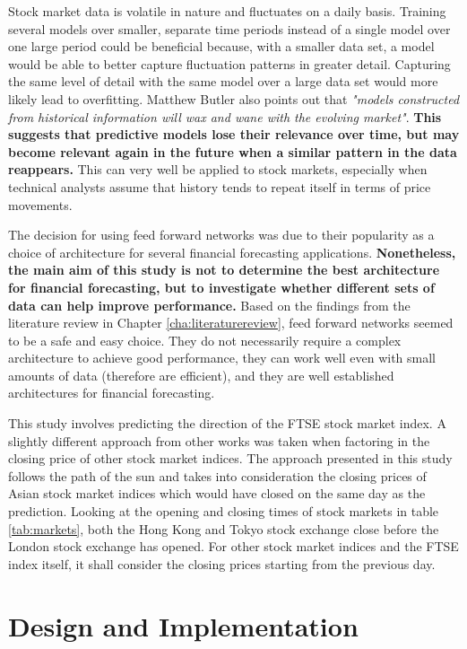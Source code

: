 \documentclass{UoYCSproject}
\begin{document}
Stock market data is volatile in nature and fluctuates on a daily basis. Training several models over smaller, separate time periods instead of a single model over one large period could be beneficial because, with a smaller data set, a model would be able to better capture fluctuation patterns in greater detail. Capturing the same level of detail with the same model over a large data set would more likely lead to overfitting. Matthew Butler also points out that \textit{"models constructed from historical information will wax and wane with the evolving market"}\cite{butler2012computational}. \textbf{This suggests that predictive models lose their relevance over time, but may become relevant again in the future when a similar pattern in the data reappears.} This can very well be applied to stock markets, especially when technical analysts assume that history tends to repeat itself in terms of price movements.

The decision for using feed forward networks was due to their popularity as a choice of architecture for several financial forecasting applications. \textbf{Nonetheless, the main aim of this study is not to determine the best architecture for financial forecasting, but to investigate whether different sets of data can help improve performance.} Based on the findings from the literature review in Chapter \ref{cha:literaturereview}, feed forward networks seemed to be a safe and easy choice. They do not necessarily require a complex architecture to achieve good performance, they can work well even with small amounts of data (therefore are efficient), and they are well established architectures for financial forecasting.    

This study involves predicting the direction of the FTSE stock market index. A slightly different approach from other works was taken when factoring in the closing price of other stock market indices. The approach presented in this study follows the path of the sun and takes into consideration the closing prices of Asian stock market indices which would have closed on the same day as the prediction. Looking at the opening and closing times of stock markets in table \ref{tab:markets}, both the Hong Kong and Tokyo stock exchange close before the London stock exchange has opened. For other stock market indices and the FTSE index itself, it shall consider the closing prices starting from the previous day.       

\chapter{Design and Implementation}
\label{cha:implementation}
\end{document}
